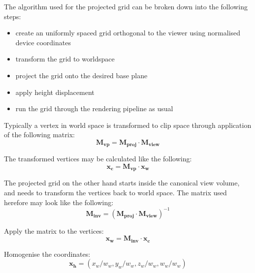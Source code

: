 The algorithm used for the projected grid can be broken down into the following
steps:
\begin{itemize}
 \item create an uniformly spaced grid orthogonal to the viewer using normalised
device coordinates
 \item transform the grid to worldspace
 \item project the grid onto the desired base plane
 \item apply height displacement
 \item run the grid through the rendering pipeline as usual
\end{itemize}

Typically a vertex in world space is transformed to clip space through
application of the following matrix:
\begin{equation}
\label{ViewProjectionMatrix}
 \mathbf{M_{vp}} = \mathbf{M_{proj}} \cdot \mathbf{M_{view}}
\end{equation}

The transformed vertices may be calculated like the following:
\begin{equation}
\label{ViewProjectionMatrixX}
 \mathbf{x_{c}} = \mathbf{M_{vp}} \cdot \mathbf{x_{w}}
\end{equation}

The projected grid on the other hand starts inside the canonical view volume,
and needs to transform the vertices back to world space. The matrix used
herefore may look like the following:
\begin{equation}
 \mathbf{M_{inv}} = (\mathbf{M_{proj}} \cdot \mathbf{M_{view}})^{-1}
\end{equation}

Apply the matrix to the vertices:
\begin{equation}
 \mathbf{x_{w}} = \mathbf{M_{inv}} \cdot \mathbf{x_{c}}
\end{equation}

Homogenise the coordinates:
\begin{equation}
 \mathbf{x_{h}} = (x_{w}/w_{w}, y_{w}/w_{w}, z_{w}/w_{w}, w_{w}/w_{w})
\end{equation}


